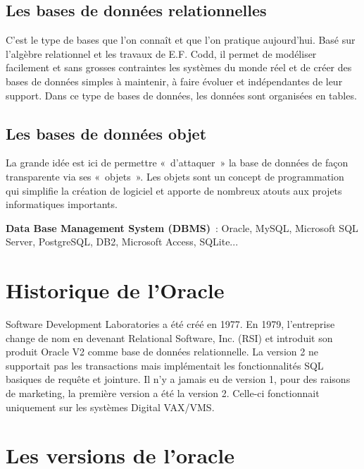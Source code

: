 \documentclass[12pt,a4paper]{report}
\begin{document}
\subsection{Les bases de données relationnelles}

C'est le type de bases que l'on connaît et que l'on pratique aujourd'hui. Basé sur
l'algèbre relationnel et les travaux de E.F. Codd, il permet de modéliser facilement
et sans grosses contraintes les systèmes du monde réel et de créer des bases de
données simples à maintenir, à faire évoluer et indépendantes de leur support. Dans
ce type de bases de données, les données sont organisées en tables.

\subsection{Les bases de données objet}

La grande idée est ici de permettre «~d'attaquer~» la base de données de façon
transparente via ses «~objets~». Les objets sont un concept de programmation qui
simplifie la création de logiciel et apporte de nombreux atouts aux projets
informatiques importants.

\medskip
\noindent\textbf{Data Base Management System (DBMS)}~: Oracle, MySQL, Microsoft SQL
Server, PostgreSQL, DB2, Microsoft Access, SQLite...

\section{Historique de l'Oracle}

Software Development Laboratories a été créé en 1977. En 1979, l'entreprise change
de nom en devenant Relational Software, Inc. (RSI) et introduit son produit Oracle
V2 comme base de données relationnelle. La version 2 ne supportait pas les
transactions mais implémentait les fonctionnalités SQL basiques de requête et
jointure. Il n'y a jamais eu de version 1, pour des raisons de marketing, la
première version a été la version 2. Celle-ci fonctionnait uniquement sur les
systèmes Digital VAX/VMS.

\section{Les versions de l'oracle}
\end{document}
